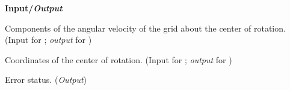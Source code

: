 \noindent
\textbf{\textcolor{input}{Input}/\textcolor{output}{\textit{Output}}}

\begin{Ventryi}{}\raggedright
\item [\fort{RotationRateVector}]
      Components of the angular velocity of the grid about the center
      of rotation.
      (\textcolor{input}{Input} for ;
      \textcolor{output}{\textit{output}} for )
\item [\fort{RotationCenter}]
      Coordinates of the center of rotation.
      (\textcolor{input}{Input} for ;
      \textcolor{output}{\textit{output}} for )
\item [\fort{ier}]
      Error status.
      (\textcolor{output}{\textit{Output}})
\end{Ventryi}
